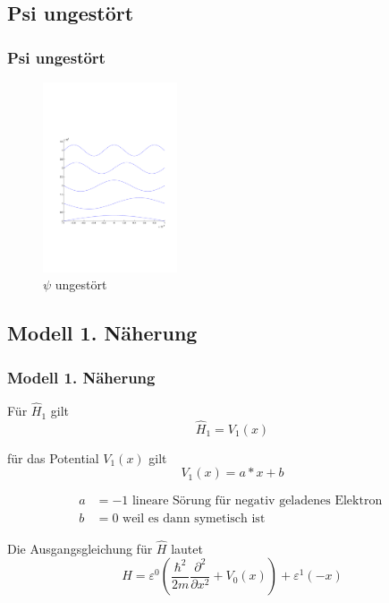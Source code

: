 \documentclass[aspectratio=169]{beamer}
\begin{document}
\subsection{ Psi ungest\"ort }
\begin{frame}
  \frametitle{ Psi ungest\"ort }
  \begin{figure}
    \centering
    \includegraphics[height=5.6cm,clip=true,trim=2cm 7cm 1cm 8cm]{../../skript/efeld/Psi_ungestoert.pdf}
    \caption{$\psi$ ungest\"ort}
    \label{abb:efeld_psi_ungestoert}
  \end{figure}

\end{frame}

\subsection{ Modell 1. N\"aherung }
\begin{frame} 
  \frametitle{ Modell 1. N\"aherung }

  F\"ur $\hat H_1$ gilt
  \[
    \hat H_1 =  V_1(x)
  \]

  f\"ur das Potential $V_1(x)$ gilt
  \[
    V_1(x) = a*x +b 
  \]
  
  \begin{align*}
    a &= -1 \text{ lineare S\"orung f\"ur negativ geladenes Elektron }
  \\
    b &= 0 \text{ weil es dann symetisch ist }
  \end{align*}

  Die Ausgangsgleichung f\"ur $\hat{H}$ lautet
  \[
    \hat{H} = \varepsilon^0 ( \frac{\hbar^2}{2m} \frac{\partial^2}{\partial x^2} + V_0(x) )
               + \varepsilon^1 (  - x )
  \]
\end{frame}
\end{document}

